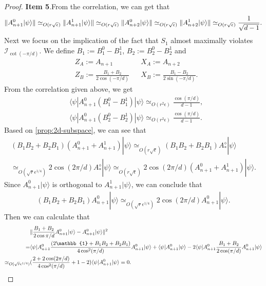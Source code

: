 \documentclass[11pt,letterpaper]{article}
\newcommand{\ket}[1]{|#1\rangle}
\newcommand{\bra}[1]{\langle#1|}
\DeclarePairedDelimiter{\norm}{\lVert}{\rVert}
\newcommand{\1}{\mathbb{1}}
\newcommand{\I}{\mathcal{I}}
\newcommand{\ep}{\epsilon}
\newcommand{\se}{\sqrt{\epsilon}}
\newcommand{\qe}{\epsilon^{1/4}}
\newcommand{\sr}{\sqrt{r}}
\newcommand{\appd}[1]{\simeq_{#1}}
\theoremstyle{definition}
\begin{document}
\begin{proof}
	\textbf{Item 5}.From the correlation, we can get that 
	\begin{align}
	\norm{A_{n+1}^0 \ket{\psi}} \appd{O(r\se)} 
	\norm{A_{n+1}^1 \ket{\psi}} \appd{O(r\se)}
	\norm{A_{n+2}^0 \ket{\psi}} \appd{O(r\se)}
	 \norm{A_{n+2}^1 \ket{\psi}} \appd{O(r\se)} \frac{1}{\sqrt{d-1}}.
	\end{align}
	Next we focus on the implication of the fact that $S_1$ almost maximally violates $\I_{\cot(-\pi/d)}$.
	We define $B_1 := B_1^0 - B_1^1$, $B_2 := B_2^0-B_2^1$ and
	\begin{align}
		&Z_A  := A_{n+1} && X_A := A_{n+2} \\
		&Z_B := \frac{B_1+B_2}{2\cos(-\pi/d)} && X_B := \frac{B_1-B_2}{2\sin(-\pi/d)}.
	\end{align}
	From the correlation given above, we get 
         \begin{align}
         	&\bra{\psi} A_{n+1}^0 (B_1^0 - B_1^1) \ket{\psi} \appd{O(r^2\ep)} \frac{\cos(\pi/d)}{d-1},\\
        		&\bra{\psi} A_{n+1}^0 (B_2^0 - B_2^1) \ket{\psi} \appd{O(r^2\ep)} \frac{\cos(\pi/d)}{d-1}.
         \end{align}
         Based on \cref{prop:2d-subspace}, we can see that 
         \begin{align}
         	(B_1B_2+B_2B_1)(A_{n+1}^0+A_{n+1}^1)\ket{\psi} 
	\appd{O(r\se)} (B_1B_2+B_2B_1) A_\ast^\diamond \ket{\psi} \\
	\appd{O(\sr \qe)} 2\cos(2\pi/d) A_\ast^\diamond \ket{\psi}
	\appd{O(r\se)} 2\cos(2\pi/d)(A_{n+1}^0+A_{n+1}^1)\ket{\psi} .
         \end{align}
         Since $A_{n+1}^0 \ket{\psi}$ is orthogonal to $A_{n+1}^1 \ket{\psi}$, we can conclude that 
         \begin{align}
         	(B_1B_2+B_2B_1)A_{n+1}^0\ket{\psi} \appd{O(\sr \qe)} 2 \cos(2\pi/d) A_{n+1}^0 \ket{\psi}.
         \end{align}
       	Then we can calculate that
       	\begin{align}
       		&\norm{\frac{B_1+B_2}{2\cos{\pi/d}} A_{n+1}^0 \ket{\psi} - A_{n+1}^0\ket{\psi}}^2 \\
		=&\bra{\psi}A_{n+1}^0 \frac{(2\1 +B_1B_2 +B_2B_1)}{4\cos^2(\pi/d)}A_{n+1}^0\ket{\psi} +
		\bra{\psi} A_{n+1}^0 \ket{\psi} - 2 \bra{\psi} A_{n+1}^0\frac{B_1+B_2}{2\cos(\pi/d)} A_{n+1}^0\ket{\psi}\\
		\appd{O(\sr \qe)}& (\frac{2+2\cos(2\pi/d)}{4\cos^2(\pi/d)}+1 - 2) \bra{\psi}A_{n+1}^0 \ket{\psi} = 0.
       	\end{align}

\end{proof}
\end{document}
